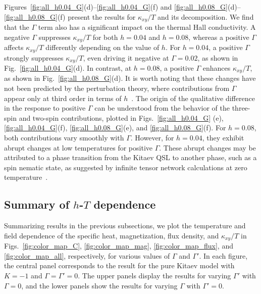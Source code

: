 \documentclass[twocolumn,superscriptaddress,showpacs, longbibliography, aps, prx]{revtex4-2}
\begin{document}
Figures~\ref{fig:all_h0.04_G}(d)--\ref{fig:all_h0.04_G}(f) and \ref{fig:all_h0.08_G}(d)--\ref{fig:all_h0.08_G}(f) present the results for $\kappa_{xy}/T$ and its decomposition. 
We find that the $\Gamma$ term also has a significant impact on the thermal Hall conductivity. 
A negative $\Gamma$ suppresses $\kappa_{xy}/T$ for both $h = 0.04$ and $h=0.08$, whereas a positive $\Gamma$ affects $\kappa_{xy}/T$ differently depending on the value of $h$.
For $h=0.04$, a positive $\Gamma$ strongly suppresses $\kappa_{xy}/T$, even driving it negative at $\Gamma = 0.02$, as shown in Fig.~\ref{fig:all_h0.04_G}(d). In contrast, at $h=0.08$, a positive $\Gamma$ enhances $\kappa_{xy}/T$, as shown in Fig.~\ref{fig:all_h0.08_G}(d). 
It is worth noting that these changes have not been predicted by the perturbation theory, where contributions from $\Gamma$ appear only at third order in terms of $h$~\cite{YamadaF2021}. 
The origin of the qualitative difference in the response to positive $\Gamma$ can be understood from the behavior of the three-spin and two-spin contributions, plotted in Figs.~\ref{fig:all_h0.04_G}
(e), \ref{fig:all_h0.04_G}(f), \ref{fig:all_h0.08_G}(e), and \ref{fig:all_h0.08_G}(f). 
For $h=0.08$, both contributions vary smoothly with $\Gamma$. 
However, for $h=0.04$, they exhibit abrupt changes at low temperatures for positive $\Gamma$. 
These abrupt changes may be attributed to a phase transition from the Kitaev QSL to another phase, such as a spin nematic state, as suggested by infinite tensor network calculations at zero temperature~\cite{Lee_NCom2020}.

\subsection{Summary of $h$-$T$ dependence}
\label{sec:summary_of_temp_field}
Summarizing results in the previous subsections, we plot the temperature and field dependence of the specific heat, magnetization, flux density, and $\kappa_{xy}/T$ in Figs.~\ref{fig:color_map_C}, \ref{fig:color_map_mag}, \ref{fig:color_map_flux}, and \ref{fig:color_map_all}, respectively, for various values of $\Gamma$ and $\Gamma'$. 
In each figure, the central panel corresponds to the result for the pure Kitaev model with $K=-1$ and $\Gamma=\Gamma'=0$. 
The upper panels display the results for varying $\Gamma'$ with $\Gamma=0$, and the lower panels show the results for varying $\Gamma$ with $\Gamma'=0$. 
\end{document}
